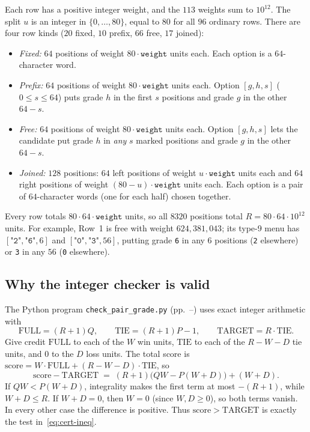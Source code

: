 \documentclass[11pt,letterpaper]{article}
\theoremstyle{cleanthm}
\newcommand{\FULL}{\mathrm{FULL}}
\newcommand{\TIE}{\mathrm{TIE}}
\newcommand{\TARGET}{\mathrm{TARGET}}
\begin{document}
Each row has a positive integer weight, and the \(113\) weights sum to \(10^{12}\). The split
\(u\) is an integer in \(\{0,\ldots,80\}\), equal to \(80\) for all \(96\) ordinary rows. There
are four row kinds (\(20\) fixed, \(10\) prefix, \(66\) free, \(17\) joined):
\begin{itemize}[itemsep=2pt,topsep=2pt]
 \item \emph{Fixed:} \(64\) positions of weight \(80\cdot\texttt{weight}\) units each. Each option
   is a \(64\)-character word.
 \item \emph{Prefix:} \(64\) positions of weight \(80\cdot\texttt{weight}\) units each. Option
   \([g,h,s]\) (\(0\le s\le 64\)) puts grade \(h\) in the first \(s\) positions and grade \(g\) in
   the other \(64-s\).
 \item \emph{Free:} \(64\) positions of weight \(80\cdot\texttt{weight}\) units each. Option
   \([g,h,s]\) lets the candidate put grade \(h\) in \emph{any} \(s\) marked positions and grade
   \(g\) in the other \(64-s\).
 \item \emph{Joined:} \(128\) positions: \(64\) left positions of weight \(u\cdot\texttt{weight}\)
   units each and \(64\) right positions of weight \((80-u)\cdot\texttt{weight}\) units each. Each
   option is a pair of \(64\)-character words (one for each half) chosen together.
\end{itemize}
Every row totals \(80\cdot 64\cdot\texttt{weight}\) units, so all \(8320\) positions total
\(R=80\cdot 64\cdot 10^{12}\) units. For example, Row~1 is free with weight \(624{,}381{,}043\);
its type-9 menu has \([\texttt{"2"},\texttt{"6"},6]\) and \([\texttt{"0"},\texttt{"3"},56]\),
putting grade \texttt{6} in any \(6\) positions (\texttt{2} elsewhere) or \texttt{3} in any \(56\)
(\texttt{0} elsewhere).

\subsection{Why the integer checker is valid}

The Python program \texttt{check\_pair\_grade.py}
(pp.~\pageref{app:checker}--\pageref{app:checker-end}) uses exact integer arithmetic with
\[
 \FULL=(R+1)Q, \qquad \TIE=(R+1)P-1, \qquad \TARGET=R\cdot\TIE.
\]
Give credit \(\FULL\) to each of the \(W\) win units, \(\TIE\) to each of the \(R-W-D\) tie units,
and \(0\) to the \(D\) loss units. The total score is
\(\mathrm{score}=W\cdot\FULL+(R-W-D)\cdot\TIE\), so
\[
 \mathrm{score}-\TARGET \;=\; (R+1)\bigl(QW-P(W+D)\bigr)+(W+D).
\]
If \(QW<P(W+D)\), integrality makes the first term at most \(-(R+1)\), while \(W+D\le R\). If
\(W+D=0\), then \(W=0\) (since \(W,D\ge0\)), so both terms vanish. In every other case the
difference is positive. Thus \(\mathrm{score}>\TARGET\) is exactly the test
in~\eqref{eq:cert-ineq}.
\end{document}
